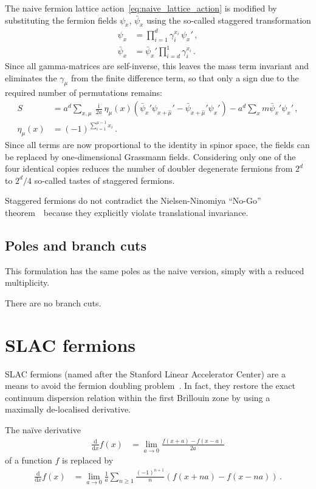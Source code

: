 \documentclass[a4paper]{article}
\DeclareMathOperator{\im}{i}
\newcommand{\md}{\ensuremath{\mathrm{d}}}
\newcommand{\deriv}[1]{\ensuremath{\frac{\md}{\md #1}}}
\newcommand{\nnt}{Nielsen-Ninomiya ``No-Go'' theorem~\cite{NIELSEN1981219}}
\begin{document}
	The naive fermion lattice action~\eqref{eq:naive_lattice_action} is modified by substituting the fermion fields $\psi_x$, $\bar\psi_x$ using the so-called staggered transformation
	\begin{align}
		\psi_x &= \prod_{i=1}^{d}\gamma_i^{x_i}\,\psi_x'\,,\\
		\bar\psi_x &= \bar\psi_x'\prod_{i=d}^{1}\gamma_i^{x_i}\,.
	\end{align}
	Since all gamma-matrices are self-inverse, this leaves the mass term invariant and eliminates the $\gamma_\mu$ from the finite difference term, so that only a sign due to the required number of permutations remains:
	\begin{align}
		S &= a^d\sum_{x,\mu}\frac{\im}{2a}\eta_\mu(x)\left(\bar\psi_x'\psi_{x+\hat\mu}'-\bar\psi_{x+\hat\mu}'\psi_{x}'\right) - a^d\sum_x m\bar\psi_x'\psi_x'\,, \label{eq:staggered_lattice_action}\\
		\eta_\mu(x) &= (-1)^{\sum_{i=1}^{\mu-1}x_i}\,.
	\end{align}
	Since all terms are now proportional to the identity in spinor space, the fields can be replaced by one-dimensional Grassmann fields. Considering only one of the four identical copies reduces the number of doubler degenerate fermions from $2^d$ to $2^d/4$ so-called tastes of staggered fermions.
	
	Staggered fermions do not contradict the \nnt\ because they explicitly violate translational invariance.
	
	\subsection{Poles and branch cuts}
	This formulation has the same poles as the naive version, simply with a reduced multiplicity.
	
	There are no branch cuts.
	
	\section{SLAC fermions}
	SLAC fermions (named after the Stanford Linear Accelerator Center) are a means to avoid the fermion doubling problem~\cite{SLAC_fermions}. In fact, they restore the exact continuum dispersion relation within the first Brillouin zone by using a maximally de-localised derivative.
	
	The na\"ive derivative
	\begin{align}
		\deriv x f(x) &= \lim_{a\rightarrow0} \frac{f(x+a)-f(x-a)}{2a}
	\end{align}
	of a function $f$ is replaced by
	\begin{align}
		\deriv x f(x) &= \lim_{a\rightarrow0} \frac1a\sum_{n\ge1} \frac{(-1)^{n+1}}{n}\left(f(x+na)-f(x-na)\right)\,.
	\end{align}
\end{document}
